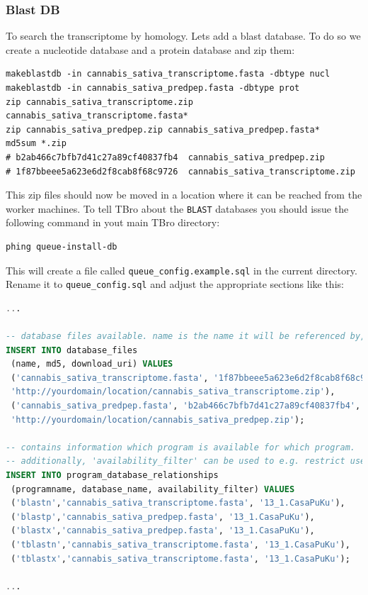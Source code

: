 \documentclass[english]{scrartcl}
\begin{document}
\subsubsection{Blast DB}
To search the transcriptome by homology. Lets add a blast database. To do so we
create a nucleotide database and a protein database and zip them:
\begin{lstlisting}
makeblastdb -in cannabis_sativa_transcriptome.fasta -dbtype nucl
makeblastdb -in cannabis_sativa_predpep.fasta -dbtype prot
zip cannabis_sativa_transcriptome.zip cannabis_sativa_transcriptome.fasta*
zip cannabis_sativa_predpep.zip cannabis_sativa_predpep.fasta*
md5sum *.zip 
# b2ab466c7bfb7d41c27a89cf40837fb4  cannabis_sativa_predpep.zip
# 1f87bbeee5a623e6d2f8cab8f68c9726  cannabis_sativa_transcriptome.zip
\end{lstlisting}
This zip files should now be moved in a location where it can be reached from
the worker machines. To tell TBro about the \texttt{BLAST} databases you should
issue the following command in yout main TBro directory:
\begin{lstlisting}
phing queue-install-db
\end{lstlisting}
This will create a file called \texttt{queue\_config.example.sql} in the current
directory. Rename it to
\texttt{queue\_config.sql} and adjust the appropriate sections like this:
\begin{lstlisting}[language=SQL]
...

-- database files available. name is the name it will be referenced by, md5 is the zip file's sum, download_uri specifies where the file can be retreived
INSERT INTO database_files
 (name, md5, download_uri) VALUES
 ('cannabis_sativa_transcriptome.fasta', '1f87bbeee5a623e6d2f8cab8f68c9726',
 'http://yourdomain/location/cannabis_sativa_transcriptome.zip'),
 ('cannabis_sativa_predpep.fasta', 'b2ab466c7bfb7d41c27a89cf40837fb4',
 'http://yourdomain/location/cannabis_sativa_predpep.zip');

-- contains information which program is available for which program.
-- additionally, 'availability_filter' can be used to e.g. restrict use for a organism-release combination
INSERT INTO program_database_relationships
 (programname, database_name, availability_filter) VALUES
 ('blastn','cannabis_sativa_transcriptome.fasta', '13_1.CasaPuKu'),
 ('blastp','cannabis_sativa_predpep.fasta', '13_1.CasaPuKu'),
 ('blastx','cannabis_sativa_predpep.fasta', '13_1.CasaPuKu'),
 ('tblastn','cannabis_sativa_transcriptome.fasta', '13_1.CasaPuKu'),
 ('tblastx','cannabis_sativa_transcriptome.fasta', '13_1.CasaPuKu');

...
\end{lstlisting}
\end{document}
